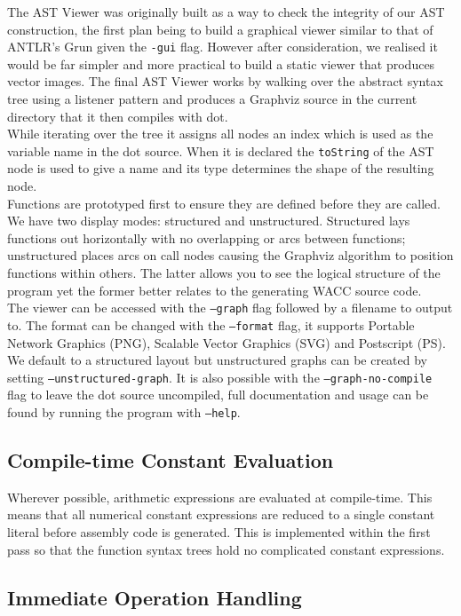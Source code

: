\documentclass[a4wide, 10pt]{article}
\begin{document}
The AST Viewer was originally built as a way to check the 
integrity of our AST construction, the first plan being to build a graphical
viewer similar to that of ANTLR's Grun given the \texttt{-gui} flag. However after consideration, we realised it would be far simpler and more practical to build a static viewer that produces vector images. The final AST Viewer works by walking over the abstract syntax tree using a listener pattern and produces a Graphviz source in the current directory that it then compiles with dot.\\
While iterating over the tree it assigns all nodes an index which is used as the 
variable name in the dot source. When it is declared the \texttt{toString} of
the AST node is used to give a name and its type determines the shape of the
resulting node.\\
\indent Functions are prototyped first to ensure they are defined before they are
called. We have two display modes: structured and unstructured. Structured
lays functions out horizontally with no overlapping or arcs between functions;
unstructured places arcs on call nodes causing the Graphviz algorithm to position functions within others. The latter allows you to see the logical structure of the program yet the former better relates to the generating WACC source code.\\
\indent The viewer can be accessed with the \texttt{--graph} flag followed by a filename
to output to. The format can be changed with the \texttt{--format} flag, it supports Portable Network Graphics (PNG), Scalable Vector Graphics (SVG) 
and Postscript (PS). We default to a structured layout but unstructured graphs 
can be created by setting \texttt{--unstructured-graph}.
It is also possible with the \texttt{--graph-no-compile}
flag to leave the dot source uncompiled, full documentation and usage can be found by running the program with \texttt{--help}.

\subsection*{Compile-time Constant Evaluation}

Wherever possible, arithmetic expressions are evaluated at compile-time. This means that all numerical constant expressions are reduced to a single constant literal before assembly code is generated. This is implemented within the first pass so that the function syntax trees hold no complicated constant expressions. 

\subsection*{Immediate Operation Handling} 
\end{document}
